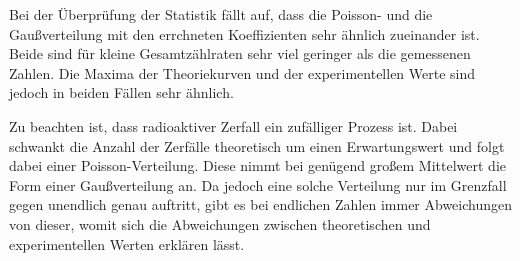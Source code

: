 Bei der Überprüfung der Statistik fällt auf, dass die Poisson- und die Gaußverteilung mit den errchneten Koeffizienten sehr ähnlich zueinander ist.
Beide sind für kleine Gesamtzählraten sehr viel geringer als die gemessenen Zahlen.
Die Maxima der Theoriekurven und der experimentellen Werte sind jedoch in beiden Fällen sehr ähnlich.

Zu beachten ist, dass radioaktiver Zerfall ein zufälliger Prozess ist. Dabei schwankt die Anzahl der Zerfälle theoretisch um einen Erwartungswert und folgt dabei einer Poisson-Verteilung.
Diese nimmt bei genügend großem Mittelwert die Form einer Gaußverteilung an.
Da jedoch eine solche Verteilung nur im Grenzfall gegen unendlich genau auftritt, gibt es bei endlichen Zahlen immer Abweichungen von dieser,
womit sich die Abweichungen zwischen theoretischen und experimentellen Werten erklären lässt.